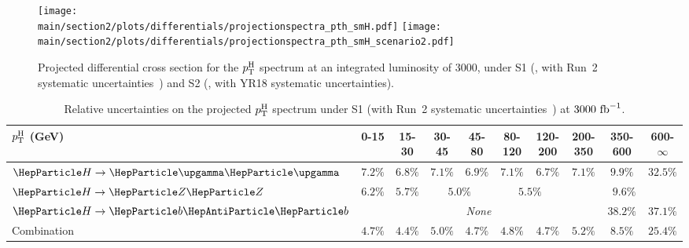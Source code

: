 \begin{figure}[hbtp]
  \begin{center}
    \texttt{[image: \\main/section2/plots/differentials/projectionspectra\_pth\_smH.pdf]}
    \texttt{[image: \\main/section2/plots/differentials/projectionspectra\_pth\_smH\_scenario2.pdf]}
    \caption{
        Projected differential cross section for the $p_\text{T}^\text{H}$ spectrum at an integrated luminosity of 3000\Uifb, under S1 (\UcmsLeft, with Run~2 systematic uncertainties~\cite{CMS-PAS-HIG-17-028}) and S2 (\UcmsRight, with YR18 systematic uncertainties).
        }
    \label{fig:proj_pth}
  \end{center}
\end{figure}

\begin{table}[htb]
\footnotesize
\begin{center}
\begin{tabular}{l|c|c|c|c|c|c|c|c|c}
$p_\text{T}^\text{H}$ (GeV)       & 0-15    &  15-30   &  30-45    &  45-80   &  80-120  &  120-200  &  200-350  &  350-600  &  600-$\infty$  \\
\hline
$\hgg$       & $7.2\%$ & $6.8\%$ & $7.1\%$ & $6.9\%$            & $7.1\%$ & $6.7\%$            & $7.1\%$ & $9.9\%$  & $32.5\%$ \\ 
$\hzz$       & $6.2\%$ & $5.7\%$ & \multicolumn{2}{c|}{$5.0\%$} & \multicolumn{2}{c|}{$5.5\%$} & \multicolumn{3}{c}{$9.6\%$} \\ 
$\hbb$       & \multicolumn{7}{c|}{\textit{None}}                                              & $38.2\%$ & $37.1\%$ \\ 
Combination  & $4.7\%$ & $4.4\%$ & $5.0\%$ & $4.7\%$            & $4.8\%$ & $4.7\%$            & $5.2\%$ & $8.5\%$  & $25.4\%$ \\
\end{tabular}
\end{center}
\caption{
    Relative uncertainties on the projected $p_\text{T}^\text{H}$ spectrum under S1 (with Run~2 systematic uncertainties~\cite{CMS-PAS-HIG-17-028}) at $3000~\text{fb}^{-1}$.
    }
\label{tab:proj_pth_unc_scen1}
\end{table}

